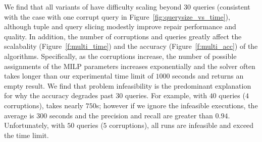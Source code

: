 We find that all variants of \naive have difficulty scaling beyond $30$ queries (consistent with the case with one corrupt query in Figure~\ref{fig:querysize_vs_time}), although tuple and query slicing modestly improve repair performance and quality.
In addition, the number of corruptions and queries greatly affect the scalabality (Figure~\ref{f:multi_time}) and the accuracy (Figure~\ref{f:multi_acc}) of the algorithms. 
Specifically, as the corruptions increase, the number of possible assignments of the MILP parameters increases exponentially and the solver often takes longer than our experimental time limit of $1000$ seconds and returns an empty result.
We find that problem infeasibility is the predominant explanation for why the accuracy degrades past $30$ queries.  
For example, with $40$ queries ($4$ corruptions), \naive takes nearly $750$s; however if we ignore the infeasible executions, the average is $300$ seconds and the precision and recall are greater than $0.94$.  
Unfortunately, with $50$ queries ($5$ corruptions), all runs are infeasible and exceed the time limit.

